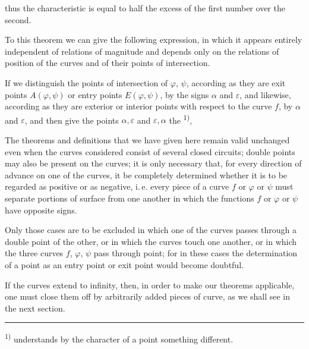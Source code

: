 thus the characteristic is equal to half the excess of the first number over the second.

To this theorem we can give the following expression, in which it appears entirely independent of relations of magnitude and depends only on the relations of position of the curves and of their points of intersection.

If we distinguish the points of intersection of $\varphi$, $\psi$, according as they are exit points $A(\varphi,\psi)$ or entry points $E(\varphi,\psi)$, by the signs $\alpha$ and $\varepsilon$, and likewise, according as they are exterior or interior points with respect to the curve $f$, by $\alpha$ and $\varepsilon$, and then give the points $\alpha,\varepsilon$ and $\varepsilon,\alpha$ the \textsuperscript{1)}, 

The theorems and definitions that we have given here remain valid unchanged even when the curves considered consist of several closed circuits; double points may also be present on the curves; it is only necessary that, for every direction of advance on one of the curves, it be completely determined whether it is to be regarded as positive or as negative, i.\,e. every piece of a curve $f$ or $\varphi$ or $\psi$ must separate portions of surface from one another in which the functions $f$ or $\varphi$ or $\psi$ have opposite signs.

Only those cases are to be excluded in which one of the curves passes through a double point of the other, or in which the curves touch one another, or in which the three curves $f$, $\varphi$, $\psi$ pass through  point; for in these cases the determination of a point as an entry point or exit point would become doubtful.

If the curves extend to infinity, then, in order to make our theorems applicable, one must close them off by arbitrarily added pieces of curve, as we shall see in the next section.

\noindent\rule{4cm}{0.4pt}

\noindent\textsuperscript{1)}  understands by the character of a point something different.

